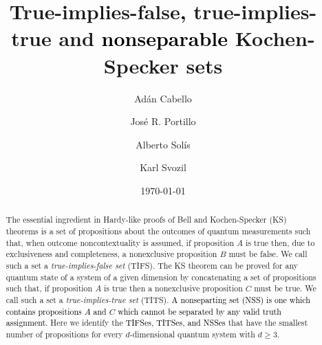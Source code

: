 \documentclass[%
  twocolumn,
 showpacs,
 showkeys,
 preprintnumbers,
 amsmath,amssymb,
 aps,
  pra,
  longbibliography,
 floatfix,
 ]{revtex4-1}
\newcommand{\karl}[1]{\textcolor{black}{#1}}
\begin{document}


\title{True-implies-false\karl{,} true-implies-true and \karl{nonseparable} Kochen-Specker sets}


\author{Ad\'an Cabello}

\author{Jos\'{e} R. Portillo}

\author{Alberto Sol\'{i}s}

\author{Karl Svozil}


\date{\today}



\begin{abstract}
The essential ingredient in Hardy-like proofs of Bell and Kochen-Specker (KS) theorems is a set of propositions about the outcomes of quantum measurements such that, when outcome noncontextuality is assumed, if proposition $A$ is true then, due to exclusiveness and completeness, a nonexclusive proposition $B$ must be false. We call such a set a {\em true-implies-false set} (TIFS). The KS theorem can be proved for any quantum state of a system of a given dimension by concatenating a set of propositions such that, if proposition $A$ is true then a nonexclusive proposition $C$ must be true. We call such a set a {\em true-implies-true set} (TITS). \karl{A nonseparting set (NSS) is one which contains propositions $A$ and  $C$ which cannot be separated by any valid truth assignment.} Here we identify the \karl{TIFSes, TITSes, and NSSes} that have the smallest number of propositions for every $d$-dimensional quantum system with $d \ge 3$.
\end{abstract}
\end{document}
